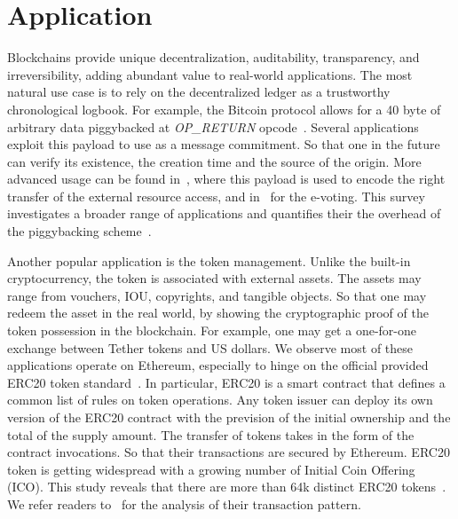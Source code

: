 \section{Application}
Blockchains provide unique decentralization, auditability, transparency, and irreversibility, adding abundant value to real-world applications. 
The most natural use case is to rely on the decentralized ledger as a trustworthy chronological logbook. 
For example, the Bitcoin protocol allows for a 40 byte of arbitrary data piggybacked at \textit{OP\_RETURN} opcode~\cite{opreturn}.
Several applications exploit this payload to use as a message commitment. 
So that one in the future can verify its existence, the creation time and the source of the origin. 
More advanced usage can be found in~\cite{maesa2017blockchain}, where this payload is used to encode the right transfer of the external resource access, and in~\cite{wu2017voting} for the e-voting. 
This survey investigates a broader range of applications and quantifies their the overhead of the piggybacking scheme~\cite{bartoletti2017analysis}. 

Another popular application is the token management.
Unlike the built-in cryptocurrency, the token is associated with external assets. 
The assets may range from vouchers, IOU, copyrights, and tangible objects. 
So that one may redeem the asset in the real world, by showing the cryptographic proof of the token possession in the blockchain. 
For example, one may get a one-for-one exchange between Tether tokens and US dollars. 
We observe most of these applications operate on Ethereum, especially to hinge on the official provided ERC20 token standard~\cite{wiki:ERC20}.
In particular, ERC20 is a smart contract that defines a common list of rules on token operations.  
Any token issuer can deploy its own version of the ERC20 contract with the prevision of the initial ownership and the total of the supply amount. 
The transfer of tokens takes in the form of the contract invocations. 
So that their transactions are secured by Ethereum.
ERC20 token is getting widespread with a growing number of Initial Coin Offering (ICO). 
This study reveals that there are more than 64k distinct ERC20 tokens~\cite{victor2019measuring}.
We refer readers to~\cite{victor2019measuring,somin2018network,chen2020traveling} for the analysis of their transaction pattern. 

